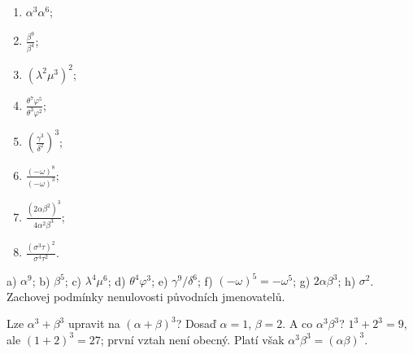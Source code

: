 \documentclass[11pt,a4paper]{article}
\begin{document}
\begin{zadaniReseniBox}[title={Samostatná práce 4}]
\begin{enumerate}[label=\alph*)]
\item $\alpha^3\alpha^6$; \item $\frac{\beta^9}{\beta^4}$;
\item $(\lambda^2\mu^3)^2$;
\item $\frac{\theta^7\varphi^5}{\theta^3\varphi^2}$;
\item $\left(\frac{\gamma^3}{\delta^2}\right)^3$;
\item $\frac{(-\omega)^8}{(-\omega)^3}$;
\item $\frac{(2\alpha\beta^2)^3}{4\alpha^2\beta^3}$;
\item $\frac{(\sigma^3\tau)^2}{\sigma^4\tau^2}$.
\end{enumerate}
\tcblower
 a) $\alpha^9$; b) $\beta^5$; c) $\lambda^4\mu^6$;
 d) $\theta^4\varphi^3$; e) $\gamma^9/\delta^6$;
 f) $(-\omega)^5=-\omega^5$; g) $2\alpha\beta^3$;
 h) $\sigma^2$. Zachovej podmínky nenulovosti původních jmenovatelů.
\end{zadaniReseniBox}
\begin{zadaniReseniBox}[title={Rozšíření 4},breakable=false]
Lze $\alpha^3+\beta^3$ upravit na $(\alpha+\beta)^3$?
Dosaď $\alpha=1$, $\beta=2$. A co $\alpha^3\beta^3$?
\tcblower
$1^3+2^3=9$, ale $(1+2)^3=27$; první vztah není obecný.
Platí však $\alpha^3\beta^3=(\alpha\beta)^3$.
\end{zadaniReseniBox}
\end{document}
